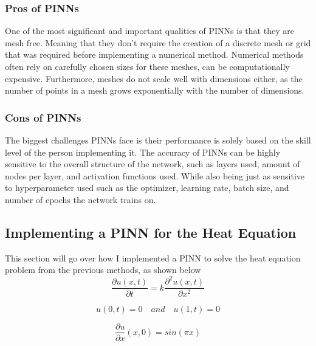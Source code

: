 \documentclass[12pt, reqno]{amsart}
\begin{document}
\subsubsection{Pros of PINNs}
One of the most significant and important qualities of PINNs is that they are mesh free. Meaning that they don't require the creation of a discrete mesh or grid that was required before implementing a numerical method. Numerical methods often rely on carefully chosen sizes for these meshes, can be computationally expensive. Furthermore, meshes do not scale well with dimensions either, as the number of points in a mesh grows exponentially with the number of dimensions.
\subsubsection{Cons of PINNs}
The biggest challenges PINNs face is their performance is solely based on the skill level of the person implementing it. The accuracy of PINNs can be highly sensitive to the overall structure of the network, such as layers used, amount of nodes per layer, and activation functions used. While also being just as sensitive to hyperparameter used such as the optimizer, learning rate, batch size, and number of epochs the network trains on.
\subsection{Implementing a PINN for the Heat Equation}
This section will go over how I implemented a PINN to solve the heat equation problem from the previous methods, as shown below
\begin{equation*}\frac{\partial{u}(x,t)}{\partial{t}} = k\frac{\partial^2u(x,t)}{\partial{x^2}}
\end{equation*}

\begin{equation*} 
u(0,t) = 0\quad and \quad u(1,t) = 0
\end{equation*}

\begin{equation*}
\frac{\partial{u}}{\partial{x}}(x,0) = sin(\pi x)
\end{equation*}
\end{document}
